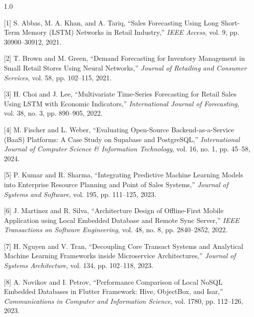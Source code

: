 \documentclass[12pt, a4paper, onecolumn, oneside]{report}
\begin{document}
\vspace{0.5cm}
\begin{spacing}{1.0}

\noindent\hangindent=1.5cm
{[1]} S. Abbas, M. A. Khan, and A. Tariq, ``Sales Forecasting Using Long Short-Term Memory (LSTM) Networks in Retail Industry,'' \textit{IEEE Access}, vol. 9, pp. 30900--30912, 2021.

\vspace{0.3cm}
\noindent\hangindent=1.5cm
{[2]} T. Brown and M. Green, ``Demand Forecasting for Inventory Management in Small Retail Stores Using Neural Networks,'' \textit{Journal of Retailing and Consumer Services}, vol. 58, pp. 102--115, 2021.

\vspace{0.3cm}
\noindent\hangindent=1.5cm
{[3]} H. Choi and J. Lee, ``Multivariate Time-Series Forecasting for Retail Sales Using LSTM with Economic Indicators,'' \textit{International Journal of Forecasting}, vol. 38, no. 3, pp. 890--905, 2022.

\vspace{0.3cm}
\noindent\hangindent=1.5cm
{[4]} M. Fischer and L. Weber, ``Evaluating Open-Source Backend-as-a-Service (BaaS) Platforms: A Case Study on Supabase and PostgreSQL,'' \textit{International Journal of Computer Science \& Information Technology}, vol. 16, no. 1, pp. 45--58, 2024.

\vspace{0.3cm}
\noindent\hangindent=1.5cm
{[5]} P. Kumar and R. Sharma, ``Integrating Predictive Machine Learning Models into Enterprise Resource Planning and Point of Sales Systems,'' \textit{Journal of Systems and Software}, vol. 195, pp. 111--125, 2023.

\vspace{0.3cm}
\noindent\hangindent=1.5cm
{[6]} J. Martinez and R. Silva, ``Architecture Design of Offline-First Mobile Application using Local Embedded Database and Remote Sync Server,'' \textit{IEEE Transactions on Software Engineering}, vol. 48, no. 8, pp. 2840--2852, 2022.

\vspace{0.3cm}
\noindent\hangindent=1.5cm
{[7]} H. Nguyen and V. Tran, ``Decoupling Core Transact Systems and Analytical Machine Learning Frameworks inside Microservice Architectures,'' \textit{Journal of Systems Architecture}, vol. 134, pp. 102--118, 2023.

\vspace{0.3cm}
\noindent\hangindent=1.5cm
{[8]} A. Novikov and I. Petrov, ``Performance Comparison of Local NoSQL Embedded Databases in Flutter Framework: Hive, ObjectBox, and Isar,'' \textit{Communications in Computer and Information Science}, vol. 1780, pp. 112--126, 2023.


\end{spacing}
\end{document}
